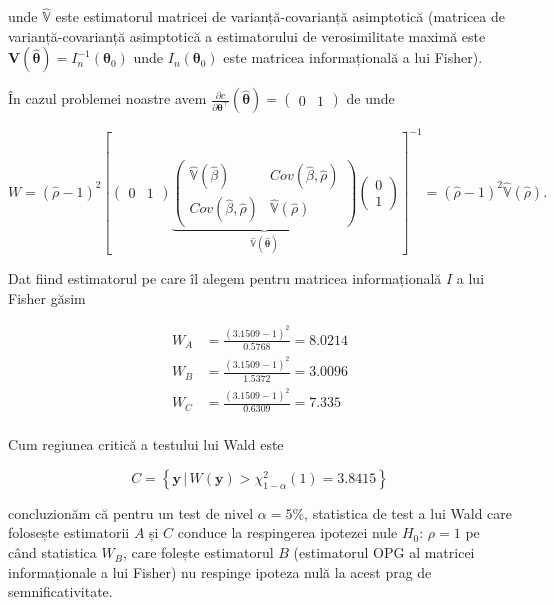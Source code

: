 \documentclass[]{article}
\renewcommand\refname{Referințe}
\begin{document}
unde \(\hat{\mathbb{V}}\) este estimatorul matricei de
varianță-covarianță asimptotică (matricea de varianță-covarianță
asimptotică a estimatorului de verosimilitate maximă este
\(\mathbf{V}(\hat{\boldsymbol{\theta}}) = I_n^{-1}(\boldsymbol{\theta}_0)\)
unde \(I_n(\boldsymbol{\theta}_0)\) este matricea informațională a lui
Fisher).

În cazul problemei noastre avem
\(\frac{\partial c}{\partial \boldsymbol{\theta}^\intercal}(\hat{\boldsymbol{\theta}}) = \begin{pmatrix}0 & 1\end{pmatrix}\)
de unde

\[
W = (\hat{\rho} - 1)^2\left[\begin{pmatrix}0 & 1\end{pmatrix} \underbrace{\begin{pmatrix}\hat{\mathbb{V}}(\hat{\beta}) & Cov(\hat{\beta}, \hat{\rho})  \\ Cov(\hat{\beta}, \hat{\rho}) &  \hat{\mathbb{V}}(\hat{\rho})\end{pmatrix}}_{\hat{\mathbb{V}}(\hat{\boldsymbol{\theta}})}\begin{pmatrix}0 \\ 1\end{pmatrix}\right]^{-1} = (\hat{\rho} - 1)^2\hat{\mathbb{V}}(\hat{\rho}).
\]

Dat fiind estimatorul pe care îl alegem pentru matricea informațională
\(I\) a lui Fisher găsim

\begin{align*}
W_{A} & = \frac{(3.1509 - 1)^2}{0.5768} = 8.0214\\
W_{B} & = \frac{(3.1509 - 1)^2}{1.5372} = 3.0096\\
W_{C} & = \frac{(3.1509 - 1)^2}{0.6309} = 7.335\\
\end{align*}

Cum regiunea critică a testului lui Wald este

\[
  C = \left\{\mathbf{y} \,|\, W(\mathbf{y}) > \chi^2_{1-\alpha}(1) = 3.8415\right\}
\]

concluzionăm că pentru un test de nivel \(\alpha = 5\%\), statistica de
test a lui Wald care folosește estimatorii \(A\) și \(C\) conduce la
respingerea ipotezei nule \(H_0:\,\rho = 1\) pe când statistica \(W_B\),
care folește estimatorul \(B\) (estimatorul OPG al matricei
informaționale a lui Fisher) nu respinge ipoteza nulă la acest prag de
semnificativitate.

\renewcommand\refname{Referințe}

\end{document}
